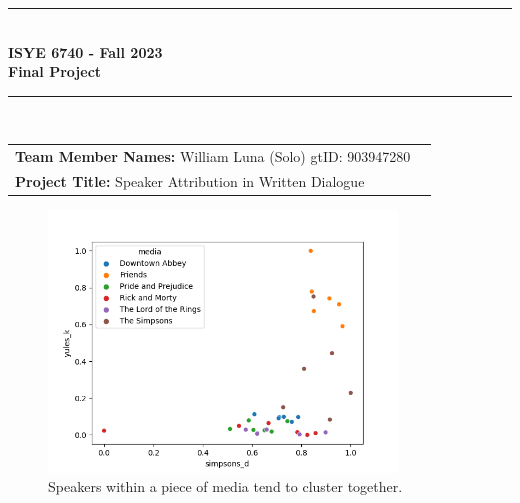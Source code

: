 \documentclass{article}
\newcommand{\largeimagewidth}{350}
\begin{document}
\begin{titlepage}
\clearpage\thispagestyle{empty}
\centering
\vspace{1cm}

\rule{\linewidth}{1mm} \\[0.5cm]
{ \Large \bfseries ISYE 6740 - Fall 2023\\[0.2cm]
Final Project}\\[0.5cm]
\rule{\linewidth}{1mm} \\[1cm]

\begin{tabular}{l p{5cm}}
\textbf{Team Member Names:} William Luna (Solo) gtID: 903947280 &   \\[10pt]
\textbf{Project Title:} Speaker Attribution in Written Dialogue &  \\[10pt]
\end{tabular} 



\begin{figure}[H]
\centering
\includegraphics[width=\largeimagewidth]{images/heuristics.png}
\caption{Speakers within a piece of media tend to cluster together.}
\end{figure}


\end{titlepage}
\end{document}
